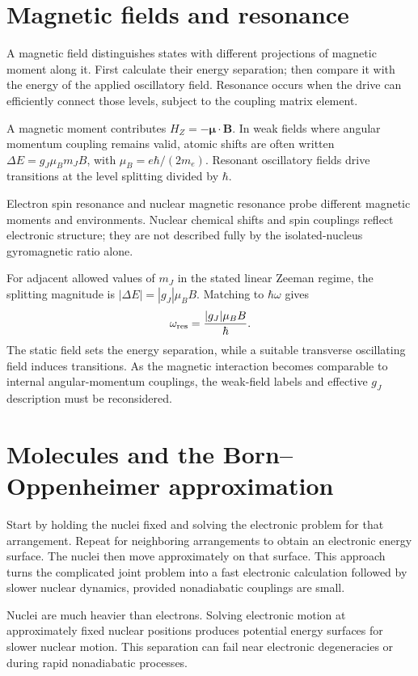 \documentclass[11pt,oneside]{book}
\newcommand{\vect}[1]{\boldsymbol{#1}}
\theoremstyle{reviewstyle}
\begin{document}
\section{Magnetic fields and resonance}
A magnetic field distinguishes states with different projections of magnetic moment along it. First calculate their energy separation; then compare it with the energy of the applied oscillatory field. Resonance occurs when the drive can efficiently connect those levels, subject to the coupling matrix element.

A magnetic moment contributes $H_Z=-\vect\mu\cdot\vect B$. In weak fields where angular momentum coupling remains valid, atomic shifts are often written $\Delta E=g_J\mu_Bm_JB$, with $\mu_B=e\hbar/(2m_e)$. Resonant oscillatory fields drive transitions at the level splitting divided by $\hbar$.

Electron spin resonance and nuclear magnetic resonance probe different magnetic moments and environments. Nuclear chemical shifts and spin couplings reflect electronic structure; they are not described fully by the isolated-nucleus gyromagnetic ratio alone.

For adjacent allowed values of $m_J$ in the stated linear Zeeman regime, the splitting magnitude is $|\Delta E|=|g_J|\mu_BB$. Matching to $\hbar\omega$ gives
\begin{equation}
\omega_{\rm res}=\frac{|g_J|\mu_BB}{\hbar}.
\end{equation}
The static field sets the energy separation, while a suitable transverse oscillating field induces transitions. As the magnetic interaction becomes comparable to internal angular-momentum couplings, the weak-field labels and effective $g_J$ description must be reconsidered.

\section{Molecules and the Born--Oppenheimer approximation}
Start by holding the nuclei fixed and solving the electronic problem for that arrangement. Repeat for neighboring arrangements to obtain an electronic energy surface. The nuclei then move approximately on that surface. This approach turns the complicated joint problem into a fast electronic calculation followed by slower nuclear dynamics, provided nonadiabatic couplings are small.

Nuclei are much heavier than electrons. Solving electronic motion at approximately fixed nuclear positions produces potential energy surfaces for slower nuclear motion. This separation can fail near electronic degeneracies or during rapid nonadiabatic processes.
\end{document}
